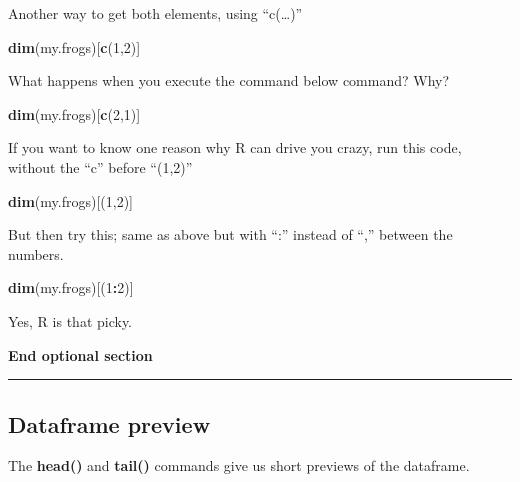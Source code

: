 \documentclass[]{book}
\newenvironment{Shaded}{\begin{snugshade}}{\end{snugshade}}
\newcommand{\KeywordTok}[1]{\textcolor[rgb]{0.13,0.29,0.53}{\textbf{#1}}}
\newcommand{\DecValTok}[1]{\textcolor[rgb]{0.00,0.00,0.81}{#1}}
\newcommand{\OperatorTok}[1]{\textcolor[rgb]{0.81,0.36,0.00}{\textbf{#1}}}
\newcommand{\NormalTok}[1]{#1}
\theoremstyle{definition}
\theoremstyle{definition}
\theoremstyle{definition}
\theoremstyle{remark}
\begin{document}
Another way to get both elements, using ``c(\ldots{})''

\begin{Shaded}
\begin{Highlighting}[]
\KeywordTok{dim}\NormalTok{(my.frogs)[}\KeywordTok{c}\NormalTok{(}\DecValTok{1}\NormalTok{,}\DecValTok{2}\NormalTok{)]}
\end{Highlighting}
\end{Shaded}

What happens when you execute the command below command? Why?

\begin{Shaded}
\begin{Highlighting}[]
\KeywordTok{dim}\NormalTok{(my.frogs)[}\KeywordTok{c}\NormalTok{(}\DecValTok{2}\NormalTok{,}\DecValTok{1}\NormalTok{)]}
\end{Highlighting}
\end{Shaded}

If you want to know one reason why R can drive you crazy, run this code,
without the ``c'' before ``(1,2)''

\begin{Shaded}
\begin{Highlighting}[]
\KeywordTok{dim}\NormalTok{(my.frogs)[(}\DecValTok{1}\NormalTok{,}\DecValTok{2}\NormalTok{)]}
\end{Highlighting}
\end{Shaded}

But then try this; same as above but with ``:'' instead of ``,'' between
the numbers.

\begin{Shaded}
\begin{Highlighting}[]
\KeywordTok{dim}\NormalTok{(my.frogs)[(}\DecValTok{1}\OperatorTok{:}\DecValTok{2}\NormalTok{)]}
\end{Highlighting}
\end{Shaded}

Yes, R is that picky.

\textbf{End optional section}

\begin{center}\rule{0.5\linewidth}{\linethickness}\end{center}

\subsection{Dataframe preview}\label{dataframe-preview}

The \textbf{head()} and \textbf{tail()} commands give us short previews
of the dataframe.
\end{document}
